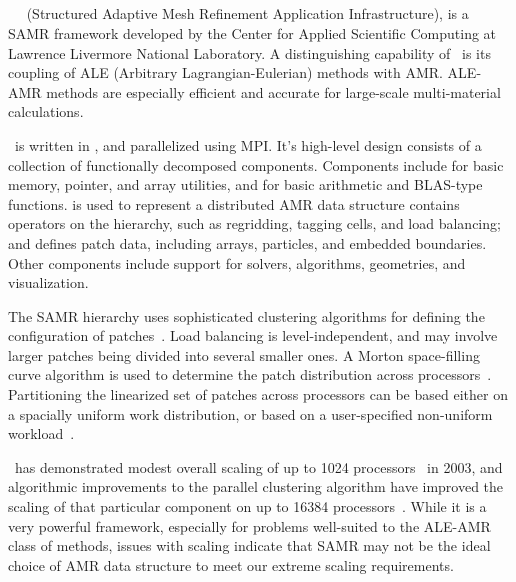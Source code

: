 \documentclass[10pt,twocolumn]{article}
\begin{document}
\subsection{\samrai} \label{ss:samrai}

\samrai~\cite{WiHo01}~\cite{wwwsamraicode} (Structured Adaptive Mesh
Refinement Application Infrastructure), is a SAMR framework developed
by the Center for Applied Scientific Computing at Lawrence Livermore
National Laboratory.  A distinguishing capability of \samrai\ is its
coupling of ALE (Arbitrary Lagrangian-Eulerian) methods with AMR.
ALE-AMR methods are especially efficient and accurate for large-scale
multi-material calculations.

\samrai\ is written in \cpp, and parallelized using MPI.  It's
high-level design consists of a collection of functionally decomposed
components.  Components include  for basic memory,
pointer, and array utilities, and  for basic
arithmetic and BLAS-type functions.   is used to
represent a distributed AMR data structure  contains
operators on the hierarchy, such as regridding, tagging cells, and
load balancing; and  defines patch data, including
arrays, particles, and embedded boundaries.  Other components include
support for solvers, algorithms, geometries, and visualization.

The SAMR hierarchy uses sophisticated clustering algorithms for
defining the configuration of patches~\cite{GuWi06}.  Load balancing
is level-independent, and may involve larger patches being divided
into several smaller ones.  A Morton space-filling curve algorithm is
used to determine the patch distribution across
processors~\cite{WiHo01}.  Partitioning the linearized set of patches
across processors can be based either on a spacially uniform work
distribution, or based on a user-specified non-uniform
workload~\cite{wwwsamraicode}.

\samrai\ has demonstrated modest overall scaling of up to 1024
processors~\cite{WiHy03} in 2003, and algorithmic improvements to the
parallel clustering algorithm have improved the scaling of that
particular component on up to 16384 processors~\cite{GuWi06}.  While
it is a very powerful framework, especially for problems well-suited
to the ALE-AMR class of methods, issues with scaling indicate that
SAMR may not be the ideal choice of AMR data structure to meet our
extreme scaling requirements.
\end{document}
